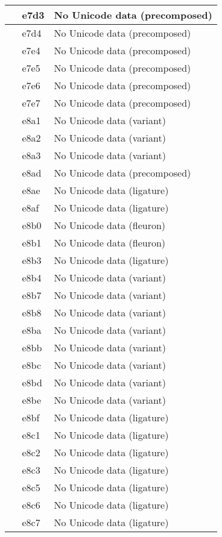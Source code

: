 \documentclass[12pt,letterpaper,openany]{book}
\begin{document}
\begin{center}
\begin{supertabular}{|m{0.25in}|m{0.5in}|m{4in}|}
			 & e7d3 & No Unicode data (precomposed)\\\hline
			 & e7d4 & No Unicode data (precomposed)\\\hline
			 & e7e4 & No Unicode data (precomposed)\\\hline
			 & e7e5 & No Unicode data (precomposed)\\\hline
			 & e7e6 & No Unicode data (precomposed)\\\hline
			 & e7e7 & No Unicode data (precomposed)\\\hline
			 & e8a1 & No Unicode data (variant)\\\hline
			 & e8a2 & No Unicode data (variant)\\\hline
			 & e8a3 & No Unicode data (variant)\\\hline
			 & e8ad & No Unicode data (precomposed)\\\hline
			 & e8ae & No Unicode data (ligature)\\\hline
			 & e8af & No Unicode data  (ligature)\\\hline
			 & e8b0 & No Unicode data (fleuron)\\\hline
			 & e8b1 & No Unicode data (fleuron)\\\hline
			 & e8b3 & No Unicode data (ligature)\\\hline
			 & e8b4 & No Unicode data (variant)\\\hline
			 & e8b7 & No Unicode data (variant)\\\hline
			 & e8b8 & No Unicode data (variant)\\\hline
			 & e8ba & No Unicode data (variant)\\\hline
			 & e8bb & No Unicode data (variant)\\\hline
			 & e8bc & No Unicode data (variant)\\\hline
			 & e8bd & No Unicode data (variant)\\\hline
			 & e8be & No Unicode data (variant)\\\hline
			 & e8bf & No Unicode data (ligature)\\\hline
			 & e8c1 & No Unicode data (ligature)\\\hline
			 & e8c2 & No Unicode data (ligature)\\\hline
			 & e8c3 & No Unicode data (ligature)\\\hline
			 & e8c5 & No Unicode data (ligature)\\\hline
			 & e8c6 & No Unicode data (ligature)\\\hline
			 & e8c7 & No Unicode data (ligature)\\\hline

\end{supertabular}
\end{center}
\end{document}
